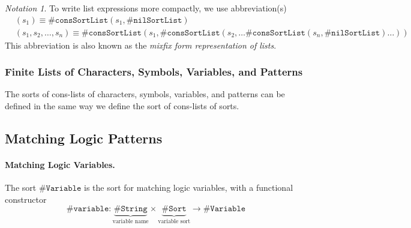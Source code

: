 \documentclass[UTF8,11pt]{article}
\newcounter{thmcounter}
\theoremstyle{plain}
\theoremstyle{definition}
\theoremstyle{remark}
\newtheorem{notation}   [thmcounter]{Notation}
\newcommand{\sharpsymbol}{\#}
\newcommand{\KString}{\texttt{\sharpsymbol String}}
\newcommand{\KSort}{\texttt{\sharpsymbol Sort}}
\newcommand{\KnilKSortList}{\texttt{\sharpsymbol nilSortList}}
\newcommand{\KconsKSortList}{\texttt{\sharpsymbol consSortList}}
\newcommand{\KVariable}{\texttt{\sharpsymbol Variable}}
\newcommand{\Kvariable}{\texttt{\sharpsymbol variable}}
\begin{document}
\begin{notation}
	\label{notation:lists}
	To write list expressions more compactly, we use abbreviation(s)
	\begin{align*}
	& (s_1) \equiv \KconsKSortList(s_1, \KnilKSortList)
	\\
	& (s_1, s_2, \dots, s_n) \equiv \KconsKSortList(s_1, \KconsKSortList(s_2, 
	\dots\KconsKSortList(s_n, \KnilKSortList)\dots))
	\end{align*}
	This abbreviation is also known as the \emph{mixfix form representation of 
	lists}.
\end{notation}

\subsubsection{Finite Lists of Characters, Symbols, Variables, and Patterns}
The sorts of cons-lists of characters, symbols, variables, and patterns can be 
defined in the same way we define the sort of cons-lists of sorts.

\subsection{Matching Logic Patterns}
\label{sec:ML-patterns}

\paragraph{Matching Logic Variables.}
The sort $\KVariable$ is the sort for 
matching logic variables, with a functional constructor
\begin{equation*}
  \Kvariable \colon \underbrace{\KString}_\text{variable name} \times 
  \underbrace{\KSort}_\text{variable sort} \to \KVariable
\end{equation*}
\end{document}
